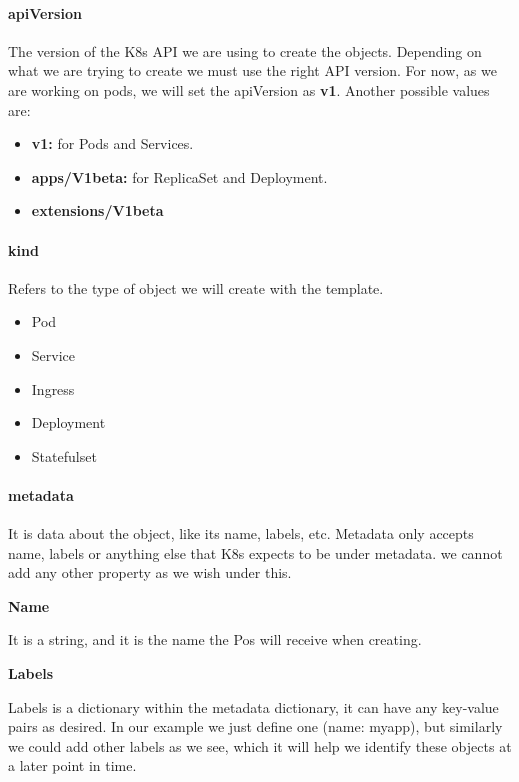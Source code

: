 \documentclass{article}
\begin{document}
\paragraph{apiVersion}

The version of the K8s API we are using to create the objects. Depending on what we are trying to create we must use the right API version. For now, as we are working on pods, we will set the apiVersion as \textbf{v1}. Another possible values are:

\begin{itemize}
    \item \textbf{v1:} for Pods and Services.
    \item \textbf{apps/V1beta:} for ReplicaSet and Deployment.
    \item \textbf{extensions/V1beta}
\end{itemize}

\paragraph{kind}

Refers to the type of object we will create with the template.

\begin{itemize}
    \item Pod
    \item Service
    \item Ingress
    \item Deployment
    \item Statefulset
\end{itemize}

\paragraph{metadata}

It is data about the object, like its name, labels, etc. Metadata only accepts name, labels or anything else that K8s expects to be under metadata. we cannot add any other property as we wish under this.

\textbf{Name} 

It is a string, and it is the name the Pos will receive when creating.

\textbf{Labels}

Labels is a dictionary within the metadata dictionary, it can have any key-value pairs as desired. In our example we just define one (name: myapp), but similarly we could add other labels as we see, which it will help we identify these objects at a later point in time. 
\end{document}
